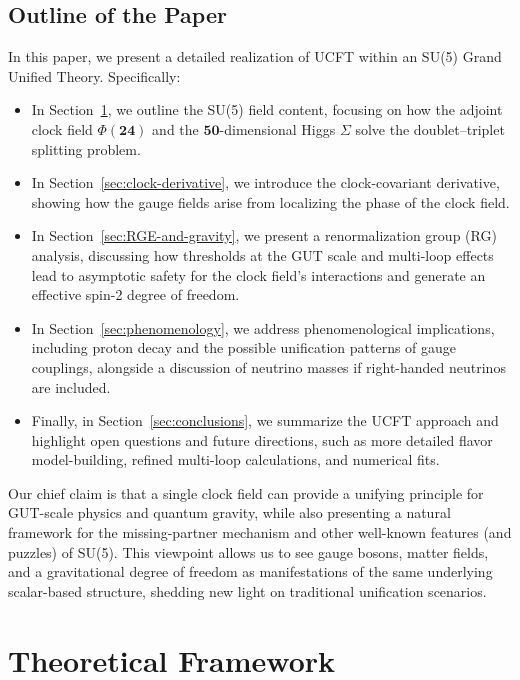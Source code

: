 \documentclass[aps,prd,preprint,groupedaddress]{revtex4-2}
\begin{document}
\subsection{Outline of the Paper}
In this paper, we present a detailed realization of UCFT within an SU(5) Grand Unified Theory.  Specifically:
\begin{itemize}
    \item In Section~\ref{sec:theory}, we outline the SU(5) field content, focusing on how the adjoint clock field $\Phi(\mathbf{24})$ and the $\mathbf{50}$-dimensional Higgs $\Sigma$ solve the doublet--triplet splitting problem.
    \item In Section~\ref{sec:clock-derivative}, we introduce the clock-covariant derivative, showing how the gauge fields arise from localizing the phase of the clock field.
    \item In Section~\ref{sec:RGE-and-gravity}, we present a renormalization group (RG) analysis, discussing how thresholds at the GUT scale and multi-loop effects lead to asymptotic safety for the clock field’s interactions and generate an effective spin-2 degree of freedom.
    \item In Section~\ref{sec:phenomenology}, we address phenomenological implications, including proton decay and the possible unification patterns of gauge couplings, alongside a discussion of neutrino masses if right-handed neutrinos are included.
    \item Finally, in Section~\ref{sec:conclusions}, we summarize the UCFT approach and highlight open questions and future directions, such as more detailed flavor model-building, refined multi-loop calculations, and numerical fits.
\end{itemize}

Our chief claim is that a single clock field can provide a unifying principle for GUT-scale physics and quantum gravity, while also presenting a natural framework for the missing-partner mechanism and other well-known features (and puzzles) of SU(5).  This viewpoint allows us to see gauge bosons, matter fields, and a gravitational degree of freedom as manifestations of the same underlying scalar-based structure, shedding new light on traditional unification scenarios.

\section{Theoretical Framework}
\label{sec:theory}
\end{document}
